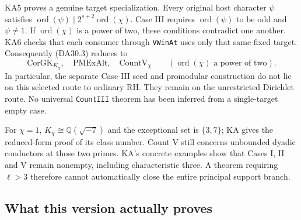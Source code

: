 KA5 proves a genuine target specialization.  Every original host
character $\psi$ satisfies
$\operatorname{ord}(\psi)\mid2^{s+2}\operatorname{ord}(\chi)$.
Case III requires $\operatorname{ord}(\psi)$ to be odd and
$\psi\ne1$.  If $\operatorname{ord}(\chi)$ is a power of two,
these conditions contradict one another.  KA6 checks that each consumer
through \texttt{VWinAt} uses only that same fixed target.
Consequently (DA30.3) reduces to
\[
 \boxed{\quad
 \mathrm{CorGK}_{K_\chi},\quad\mathrm{PMExAlt},\quad
 \mathrm{CountV}_\chi\qquad
        (\operatorname{ord}(\chi)\text{ a power of two}).\quad}    \tag{DA30.4}
\]
In particular, the separate Case-III seed and promodular construction
do not lie on this selected route to ordinary RH.  They remain on the
unrestricted Dirichlet route.  No universal \texttt{CountIII} theorem
has been inferred from a single-target empty case.

For $\chi=1$, $K_\chi\cong\mathbb Q(\sqrt{-7})$ and the exceptional
set is $\{3,7\}$; KA gives the reduced-form proof of its class number.
Count V still concerns unbounded dyadic conductors at those two primes.
KA's concrete examples show that Cases I, II and V remain nonempty,
including characteristic three.  A theorem requiring $\ell>3$ therefore
cannot automatically close the entire principal support branch.

\subsection{What this version actually proves}

